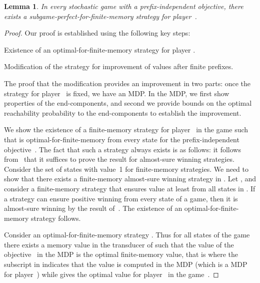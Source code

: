 \documentclass{article}
\newtheorem{lemma}{Lemma}
\begin{document}
\begin{lemma} \label{lem:subgame-perfect}
In every stochastic game with a prefix-independent objective, there exists a 
subgame-perfect-for-finite-memory strategy for player~.
\end{lemma}
\begin{proof}
Our proof is established using the following key steps:
\begin{compactenum}
\item Existence of an optimal-for-finite-memory strategy for player .

\item Modification of the strategy for improvement of values after
finite prefixes.

\item The proof that the modification provides an 
improvement in two parts: 
once the strategy for player~ is fixed, we have an MDP. 
In the MDP, we first show properties of the end-components, and 
second we provide bounds on the optimal reachability probability to 
the end-components to establish the improvement.

\end{compactenum}

\smallskip{}
We show the existence of a finite-memory strategy  for player~ 
in the game  such that  is optimal-for-finite-memory from every 
state for the prefix-independent objective~.
The fact that such a strategy always exists is as follows: 
it follows from~\cite[Theorem~4.3]{GH10} that it suffices to prove the result 
for almost-sure winning strategies.
Consider the set  of states with value~1 for finite-memory strategies. 
We need to show that there exists a finite-memory almost-sure winning strategy
in .
Let , and consider a finite-memory strategy that ensures 
value at least  from all states in . 
If a strategy can ensure positive winning from every state of a game, 
then it is almost-sure winning by the result of~\cite{Cha07b}.
The existence of an optimal-for-finite-memory strategy follows.

\smallskip{}
Consider an optimal-for-finite-memory strategy .
Thus for all states  of the game  there
exists a memory value  in the transducer of  such that the value
of the objective~ in the MDP  is the optimal finite-memory value, 
that is 
where the subscript in  indicates that 
the value is computed in the MDP  (which is a MDP for player~)
while  gives the optimal value for player~ in the game~. 



\end{proof}
\end{document}
